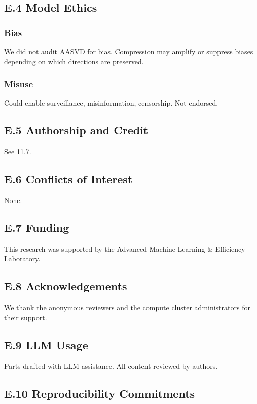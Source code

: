 \subsection{E.4 Model Ethics}

\subsubsection{Bias}

We did not audit AASVD for bias. Compression may amplify or suppress biases 
depending on which directions are preserved.

\subsubsection{Misuse}

Could enable surveillance, misinformation, censorship. Not endorsed.

\subsection{E.5 Authorship and Credit}

See  11.7.

\subsection{E.6 Conflicts of Interest}

None.

\subsection{E.7 Funding}

This research was supported by the Advanced Machine Learning \& Efficiency Laboratory.

\subsection{E.8 Acknowledgements}

We thank the anonymous reviewers and the compute cluster administrators for their support.

\subsection{E.9 LLM Usage}

Parts drafted with LLM assistance. All content reviewed by authors.

\subsection{E.10 Reproducibility Commitments}

